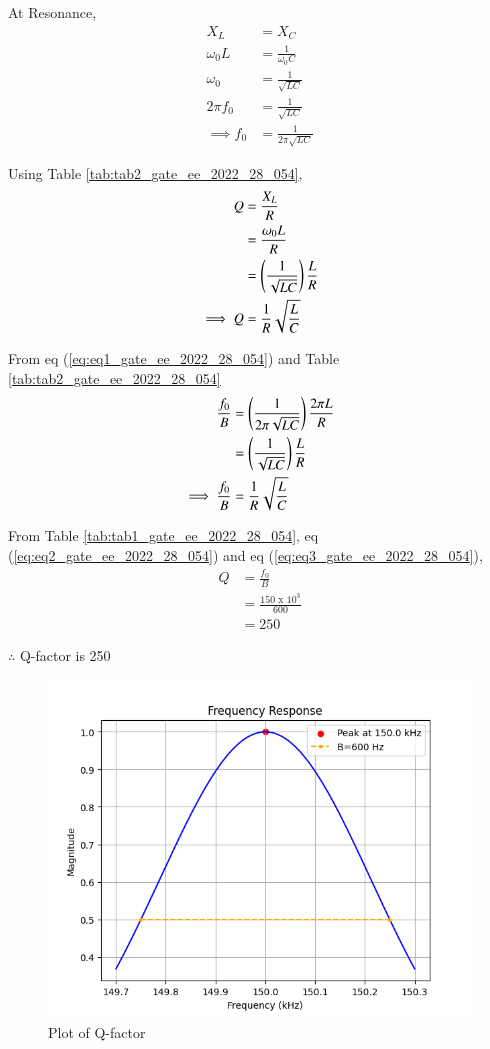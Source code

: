 \documentclass[journal,12pt,twocolumn]{IEEEtran}
\begin{document}
At Resonance, 
\begin{align}
    X_L & = X_C\\
    \omega_0 L &= \frac{1}{\omega_0 C}\\
    \omega_0 &= \frac{1}{\sqrt{LC}}\\
    2 \pi f_0 &= \frac{1}{\sqrt{LC}}\\
    \implies f_0 &= \frac{1}{2 \pi \sqrt{LC}} \label{eq:eq1_gate_ee_2022_28_054}    
\end{align}

Using Table \ref{tab:tab2_gate_ee_2022_28_054},
\begin{align}
    Q &= \frac{X_L}{R}\\
    &= \frac{\omega_0 L}{R}\\
    &= \left(\frac{1}{\sqrt{LC}}\right)\frac{L}{R}\\
    \implies Q &= \frac{1}{R}\sqrt{\frac{L}{C}} \label{eq:eq2_gate_ee_2022_28_054}
\end{align}

From eq (\ref{eq:eq1_gate_ee_2022_28_054}) and Table \ref{tab:tab2_gate_ee_2022_28_054}
\begin{align}
    \frac{f_0}{B} &= \left(\frac{1}{2\pi \sqrt{LC}}\right)\frac{2 \pi L}{R}\\
    &= \left(\frac{1}{\sqrt{LC}}\right)\frac{L}{R}\\
    \implies \frac{f_0}{B} &= \frac{1}{R}\sqrt{\frac{L}{C}} \label{eq:eq3_gate_ee_2022_28_054}
\end{align}

From Table \ref{tab:tab1_gate_ee_2022_28_054}, eq (\ref{eq:eq2_gate_ee_2022_28_054}) and eq (\ref{eq:eq3_gate_ee_2022_28_054}),
\begin{align}
    Q &= \frac{f_0}{B}\\
     &=\frac{150 \text{ x } 10^3}{600}\\
    &= 250
\end{align}

$\therefore$ Q-factor is 250

\begin{figure}[ht]
    \centering
    \includegraphics[width=\columnwidth]{figs/Figure_1.png}
    \caption{Plot of Q-factor}
    \label{fig:fig1_gate_ee_2022_18_054}
\end{figure}
\end{document}
